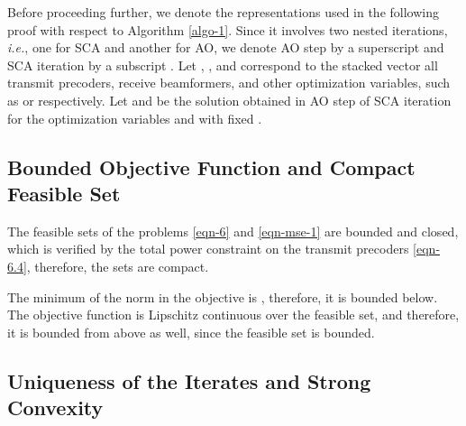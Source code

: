 Before proceeding further, we denote the representations used in the following proof with respect to Algorithm \ref{algo-1}. Since it involves two nested iterations, \textit{i.e.}, one for \ac{SCA} and another for \ac{AO}, we denote \ac{AO} step by a superscript  and \ac{SCA} iteration by a subscript . Let \me{\mx}, \me{\my}, and \me{\mz} correspond to the stacked vector all transmit precoders, receive beamformers, and other optimization variables, such as  or  respectively. Let  and  be the solution obtained in  \ac{AO} step of  \ac{SCA} iteration for the optimization variables \me{\mx} and \me{\gamma} with fixed \me{\my}. %

\subsection{Bounded Objective Function and Compact Feasible Set} \label{b_obj}
The feasible sets of the problems \eqref{eqn-6} and \eqref{eqn-mse-1} are bounded and closed, which is verified by the total power constraint on the transmit precoders \eqref{eqn-6.4}, therefore, the sets are compact. 

The minimum of the norm in the objective is , therefore, it is bounded below. The objective function is Lipschitz continuous over the feasible set, and therefore, it is bounded from above as well, since the feasible set is bounded. %

\subsection{Uniqueness of the Iterates and Strong Convexity} \label{c-a}

